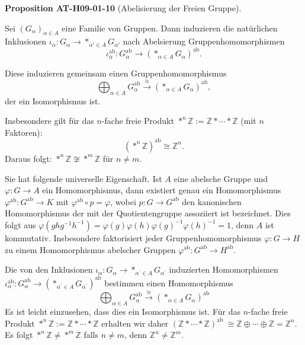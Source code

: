 \documentclass[10pt, letterpaper]{article}
\newcommand{\CustomHeading}[3]{%
  \par\medskip\noindent%
  \textbf{#1 #2} \textnormal{(#3)}.\enskip%
}
\newenvironment{PROP}[2]{\begin{unitbox}\CustomHeading{Proposition}{#1}{#2}}{\end{unitbox}}
\begin{document}
\begin{PROP}{AT-H09-01-10}{Abelisierung der Freien Gruppe}
Sei $(G_\alpha)_{\alpha \in A}$ eine Familie von Gruppen. Dann induzieren die natürlichen Inklusionen $\iota_\alpha: G_\alpha \rightarrow *_{\alpha' \in A} G_{\alpha'}$ nach Abelsierung Gruppenhomomorphismen
\[
\iota_\alpha^{\mathrm{ab}}: G_\alpha^{\mathrm{ab}} \rightarrow \left(*_{\alpha \in A} G_\alpha\right)^{\mathrm{ab}}.
\]
\begin{center}
\end{center}

Diese induzieren gemeinsam einen Gruppenhomomorphismus
\[
\bigoplus_{\alpha \in A} G_\alpha^{\mathrm{ab}} \xrightarrow{\cong} \left(*_{\alpha \in A} G_\alpha\right)^{\mathrm{ab}},
\]
der ein Isomorphismus ist.

Insbesondere gilt für das $n$-fache freie Produkt $*^n \mathbb{Z} := \mathbb{Z} * \cdots * \mathbb{Z}$ (mit $n$ Faktoren):
\[
\left(*^n \mathbb{Z}\right)^{\mathrm{ab}} \cong \mathbb{Z}^n.
\]
Daraus folgt: $*^n \mathbb{Z} \not\cong *^m \mathbb{Z}$ für $n \neq m$.
\end{PROP}





Sie hat folgende universelle Eigenschaft. Ist $A$ eine abelsche Gruppe und $\varphi: G \rightarrow A$ ein Homomorphismus, dann existiert genau ein Homomorphismus $\varphi^{\mathrm{ab}}: G^{\mathrm{ab}} \rightarrow K$ mit $\varphi^{\mathrm{ab}} \circ p=\varphi$, wobei $p: G \rightarrow G^{\mathrm{ab}}$ den kanonischen Homomorphismus der mit der Quotientengruppe assoziiert ist bezeichnet. Dies folgt aus $\varphi\left(g h g^{-1} h^{-1}\right)=\varphi(g) \varphi(h) \varphi(g)^{-1} \varphi(h)^{-1}=1$, denn $A$ ist kommutativ. Insbesondere faktorisiert jeder Gruppenhomomorphismus $\varphi: G \rightarrow H$ zu einem Homomorphismus abelscher Gruppen $\varphi^{\mathrm{ab}}: G^{\mathrm{ab}} \rightarrow H^{\mathrm{ab}}$.

Die von den Inklusionen $\iota_\alpha: G_\alpha \rightarrow *_{\alpha^{\prime} \in A} G_{\alpha^{\prime}}$ induzierten Homomorphismen $\iota_\alpha^{\mathrm{ab}}: G_\alpha^{\mathrm{ab}} \rightarrow\left(*_{\alpha^{\prime} \in A} G_{\alpha^{\prime}}\right)^{\mathrm{ab}}$ bestimmen einen Homomorphismus
$$
\bigoplus_{\alpha \in A} G_\alpha^{\mathrm{ab}} \xrightarrow{\cong} \left(*_{\alpha \in A} G_\alpha\right)^{\mathrm{ab}}
$$
Es ist leicht einzusehen, dass dies ein Isomorphismus ist. Für das $n$-fache freie Produkt $*^n \mathbb{Z}:=\mathbb{Z} * \cdots * \mathbb{Z}$ erhalten wir daher $(\mathbb{Z} * \cdots * \mathbb{Z})^{\text {ab }} \cong \mathbb{Z} \oplus \cdots \oplus \mathbb{Z}=\mathbb{Z}^n$. Es folgt $*^n \mathbb{Z} \neq *^m \mathbb{Z}$ falls $n \neq m$, denn $\mathbb{Z}^n \neq \mathbb{Z}^m$.
\end{document}
